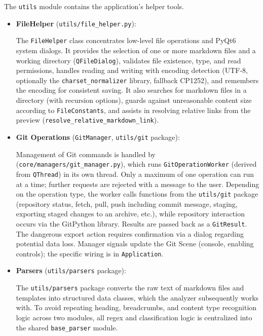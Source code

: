 \documentclass[12pt, a4paper]{article}
\begin{document}
The \texttt{utils} module contains the application's helper tools.
\begin{itemize}
    \item \textbf{FileHelper} (\texttt{utils/file\_helper.py}):

    The \texttt{FileHelper} class concentrates low-level file operations and PyQt6 system dialogs. 
    It provides the selection of one or more markdown files and a working directory (\texttt{QFileDialog}), 
    validates file existence, type, and read permissions, handles reading and writing with encoding detection 
    (UTF-8, optionally the \texttt{charset\_normalizer} library, fallback CP1252), and remembers the encoding 
    for consistent saving. It also searches for markdown files in a directory (with recursion options), 
    guards against unreasonable content size according to \texttt{FileConstants}, and assists in resolving 
    relative links from the preview (\texttt{resolve\_relative\_markdown\_link}).

    \item \textbf{Git Operations} (\texttt{GitManager}, \texttt{utils/git} package):

    Management of Git commands is handled by (\texttt{core/managers/git\_manager.py}), 
    which runs \texttt{GitOperationWorker} (derived from \texttt{QThread}) in its own thread. Only a maximum 
    of one operation can run at a time; further requests are rejected with a message to the user. Depending 
    on the operation type, the worker calls functions from the \texttt{utils/git} package (repository status, 
    fetch, pull, push including commit message, staging, exporting staged changes to an archive, etc.), 
    while repository interaction occurs via the GitPython library. Results are passed back as a \texttt{GitResult}. 
    The dangerous export action requires confirmation via a dialog regarding potential data loss.
    Manager signals update the Git Scene (console, enabling controls); the specific wiring is in \texttt{Application}.

    \item \textbf{Parsers} (\texttt{utils/parsers} package):

    The \texttt{utils/parsers} package converts the raw text of markdown files and templates into structured data classes, 
    which the analyzer subsequently works with. To avoid repeating heading, breadcrumbs, and content type recognition 
    logic across two modules, all regex and classification logic is centralized into the shared \texttt{base\_parser} module.


\end{itemize}
\end{document}
